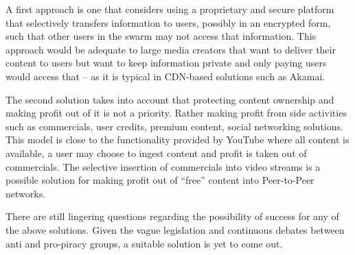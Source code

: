 A first approach is one that considers using a proprietary and secure platform
that selectively transfers information to users, possibly in an encrypted
form, such that other users in the swarm may not access that information. This
approach would be adequate to large media creators that want to deliver their
content to users but want to keep information private and only paying users
would access that -- as it is typical in CDN-based solutions such as Akamai.

The second solution takes into account that protecting content ownership and
making profit out of it is not a priority. Rather making profit from side
activities such as commercials, user credits, premium content, social
networking solutions. This model is close to the functionality provided by
YouTube where all content is available, a user may choose to ingest content
and profit is taken out of commercials. The selective insertion of commercials
into video streams is a possible solution for making profit out of ``free''
content into Peer-to-Peer networks.

There are still lingering questions regarding the possibility of success for
any of the above solutions. Given the vague legislation and continuous debates
between anti and pro-piracy groups, a suitable solution is yet to come out.


%
